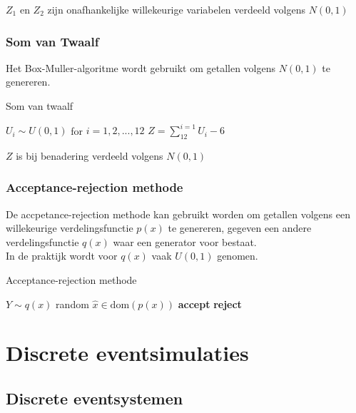 \documentclass{article}
\begin{document}
	$Z_1$ en $Z_2$ zijn onafhankelijke willekeurige variabelen verdeeld volgens $N(0,1)$
	
	
	\subsubsection{Som van Twaalf}
	
	Het Box-Muller-algoritme wordt gebruikt om getallen volgens $N(0,1)$ te genereren.
	
	\begin{algorithm}[!ht]
		\caption{Som van twaalf}
		\begin{algorithmic}[1]
				\State $U_i \sim U(0,1)$ for $i=1,2,...,12$
				\State $Z = \sum_{12}^{i=1}U_i - 6$
			\EndProcedure
		\end{algorithmic}
	\end{algorithm}

	$Z$ is bij benadering verdeeld volgens $N(0,1)$
	
	\subsubsection{Acceptance-rejection methode}
	
	De accpetance-rejection methode kan gebruikt worden om getallen volgens een willekeurige verdelingsfunctie $p(x)$ te genereren, gegeven een andere verdelingsfunctie $q(x)$ waar een generator voor bestaat.\\
	
	In de praktijk wordt voor $q(x)$ vaak $U(0,1)$ genomen.
	
	\begin{algorithm}[!ht]
		\caption{Acceptance-rejection methode}
		\begin{algorithmic}[1]
				\State $Y \sim q(x)$ random
				\State $\hat{x} \in \text{dom}(p(x))$
					\State \textbf{accept}
					\State \textbf{reject}
				\EndIf
			\EndProcedure
		\end{algorithmic}
	\end{algorithm}
	
	
	\section{Discrete eventsimulaties}
	
	\subsection{Discrete eventsystemen}
	
\end{document}
